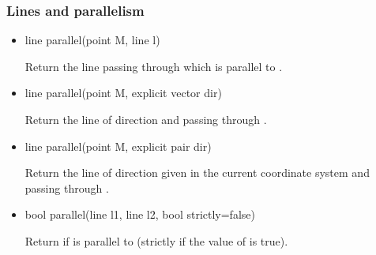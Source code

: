 \documentclass[pdftex]{article}
\begin{document}
\subsubsection{Lines and parallelism}
\begin{itemize}
\item {}%
  \begin{Vcolor}
    line parallel(point M, line l)
  \end{Vcolor}
  Return the line passing through  which is parallel to .
  \item {}%
  \begin{Vcolor}
    line parallel(point M, explicit vector dir)
  \end{Vcolor}
  Return the line of direction  and passing through .
  \item {}%
  \begin{Vcolor}
    line parallel(point M, explicit pair dir)
  \end{Vcolor}
  Return the line of direction  given in the current
  coordinate system and passing through .
  \item {}%
  \begin{Vcolor}
    bool parallel(line l1, line l2, bool strictly=false)
  \end{Vcolor}
  Return  if  is parallel to  (strictly
  if the value of  is true).
  \end{itemize}
\end{document}
